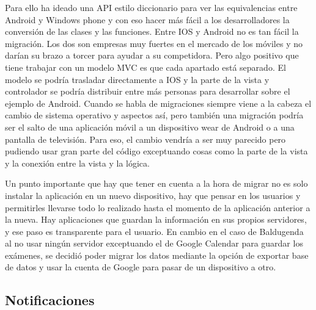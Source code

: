 Para ello ha ideado una API estilo diccionario para ver las equivalencias entre Android y Windows phone y con eso hacer más fácil a los desarrolladores la conversión de las clases y las funciones.
Entre IOS y Android no es tan fácil la migración. Los dos son empresas muy fuertes en el mercado de los móviles y no darían su brazo a torcer para ayudar a su competidora.
Pero algo positivo que tiene trabajar con un modelo MVC es que cada apartado está separado.
El modelo se podría trasladar directamente a IOS y la parte de la vista y controlador se podría distribuir entre más personas para desarrollar sobre el ejemplo de Android.
Cuando se habla de migraciones siempre viene a la cabeza el cambio de sistema operativo y aspectos así, pero también una migración podría ser el salto de una aplicación móvil a un dispositivo wear de Android o a una pantalla de televisión. Para eso, el cambio vendría a ser muy parecido pero pudiendo usar gran parte del código exceptuando cosas como la parte de la vista y la conexión entre la vista y la lógica.

Un punto importante que hay que tener en cuenta a la hora de migrar no es solo instalar la aplicación en un nuevo dispositivo, hay que pensar en los usuarios y permitirles llevarse todo lo realizado hasta el momento de la aplicación anterior a la nueva.
Hay aplicaciones que guardan la información en sus propios servidores, y ese paso es transparente para el usuario.
En cambio en el caso de Baldugenda al no usar ningún servidor exceptuando el de Google Calendar para guardar los exámenes, se decidió poder migrar los datos mediante la opción de exportar base de datos y usar la cuenta de Google para pasar de un dispositivo a otro.

\subsection{Notificaciones}
\label{subsecc:Notificaciones}

